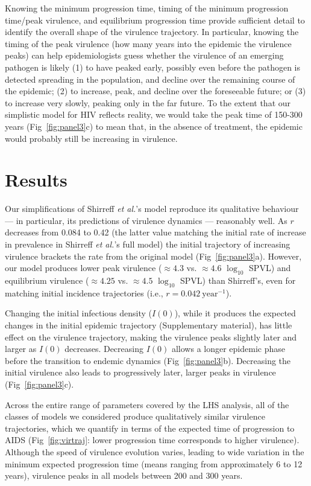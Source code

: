 \documentclass[10pt,letterpaper]{article}
\renewcommand{\figurename}{Fig}
\newcommand{\Lspvl}{$\log_{10}$ SPVL}
\newcommand{\etal}{\textit{et al.}}
\begin{document}
Knowing the minimum progression time, timing of the minimum progression time/peak virulence, and equilibrium progression time provide sufficient detail to identify the overall shape of the virulence trajectory.
In particular, knowing the timing of the peak virulence (how many years
into the epidemic the virulence peaks) can help epidemiologists
guess whether the virulence of an emerging pathogen is likely (1)
to have peaked early, possibly even before the pathogen is detected
spreading in the population, and decline over the remaining course
of the epidemic; (2) to increase, peak, and decline over the
foreseeable future; or (3) to increase very slowly, peaking only
in the far future. To the extent that our simplistic model for HIV
reflects reality, we would take the peak time of 150-300 years 
(\figurename~\ref{fig:panel3}c) to mean that, in the absence of
treatment, the epidemic would probably still be increasing in virulence.

\section*{Results}

Our simplifications of Shirreff \etal's model \cite{shirreff_transmission_2011} reproduce its qualitative behaviour --- in particular, its predictions of virulence dynamics --- reasonably well. As $r$ decreases from 0.084 to 0.42 (the latter value matching the initial rate of increase in prevalence in Shirreff \etal's full model) the initial trajectory of increasing virulence brackets the rate from the original model (\figurename~\ref{fig:panel3}a). However, our model produces lower peak virulence ($\approx 4.3$ vs. $\approx 4.6$ \Lspvl) 
and equilibrium virulence ($\approx 4.25$ vs. $\approx 4.5$ \Lspvl) than Shirreff's, even for matching initial incidence trajectories (i.e., $r=0.042~\textrm{year}^{-1}$).

Changing the initial infectious density ($I(0)$), while it produces the expected changes in the initial epidemic trajectory (Supplementary material), has little effect on the virulence trajectory, making the virulence peaks slightly later and larger as $I(0)$ decreases. Decreasing $I(0)$ allows a longer epidemic phase before the transition to endemic dynamics (\figurename~\ref{fig:panel3}b). Decreasing the initial virulence
also leads to progressively later, larger peaks in virulence (\figurename~\ref{fig:panel3}c).

Across the entire range of parameters covered by the LHS analysis, all of the classes of models we considered produce qualitatively similar virulence trajectories, which we quantify in terms of the expected time of progression
to AIDS (\figurename~\ref{fig:virtraj}: lower progression time corresponds
to higher virulence). Although the speed of virulence evolution varies, leading to wide variation in the minimum expected progression time (means ranging from approximately 6 to 12 years), virulence peaks in all models between 200 and 300 years.
\end{document}
